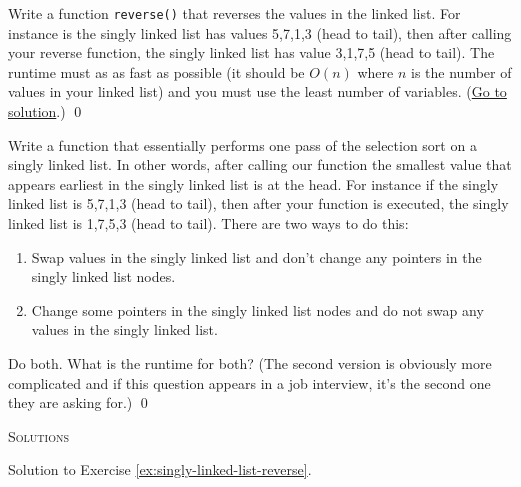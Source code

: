 \begin{ex}\label{ex:singly-linked-list-reverse}
  Write a function
  \texttt{reverse()} that reverses the values in the linked list.
  For instance is the singly linked list has values 5,7,1,3 (head to tail),
  then after calling your reverse function, the singly linked list
  has value 3,1,7,5 (head to tail).
  The runtime must as as fast as possible (it should be $O(n)$
  where $n$ is the number of values in your linked list) and you must use
  the least number of variables.
  (\hyperref[sol:singly-linked-list-reverse]{Go to solution}.)
  \qed
\end{ex}

\begin{ex}\label{ex:singly-linked-selection-sort-one-pass}
  Write a function that essentially performs one pass of the selection
  sort on a singly linked list.
  In other words, after calling our function the smallest value that
  appears earliest in the singly linked list 
  is at the head.
  For instance if the singly linked list is 5,7,1,3 (head to tail),
  then after your function is executed, the singly linked list is
  1,7,5,3 (head to tail).
  There are two ways to do this:
  \begin{enumerate}[nosep]
  \item
    Swap values in the singly linked list and don't change
    any pointers in the singly linked list nodes.
  \item 
    Change
    some pointers in the singly linked list nodes and do not
    swap any values in the singly linked list.
  \end{enumerate}
  Do both. What is the runtime for both?
  (The second version is obviously more complicated
  and if this question appears in a job interview,
  it's the second one they are asking for.)
  \qed
\end{ex}




\newpage
\textsc{Solutions}

Solution to
Exercise \ref{ex:singly-linked-list-reverse}\label{sol:singly-linked-list-reverse}.

